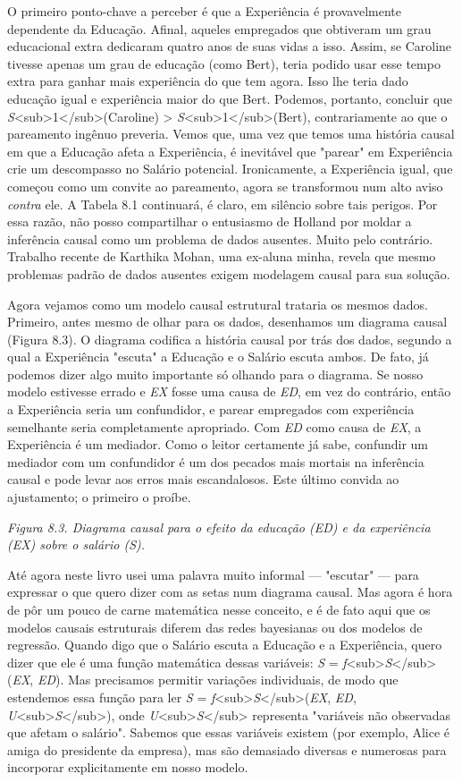 \documentclass[11pt,a5paper,twoside]{book}
\begin{document}
O primeiro ponto-chave a perceber é que a Experiência é provavelmente dependente da Educação. Afinal, aqueles empregados que obtiveram um grau educacional extra dedicaram quatro anos de suas vidas a isso. Assim, se Caroline tivesse apenas um grau de educação (como Bert), teria podido usar esse tempo extra para ganhar mais experiência do que tem agora. Isso lhe teria dado educação igual e experiência maior do que Bert. Podemos, portanto, concluir que \textit{S}<sub>1</sub>(Caroline) > \textit{S}<sub>1</sub>(Bert), contrariamente ao que o pareamento ingênuo preveria. Vemos que, uma vez que temos uma história causal em que a Educação afeta a Experiência, é inevitável que "parear" em Experiência crie um descompasso no Salário potencial. Ironicamente, a Experiência igual, que começou como um convite ao pareamento, agora se transformou num alto aviso \textit{contra} ele. A Tabela 8.1 continuará, é claro, em silêncio sobre tais perigos. Por essa razão, não posso compartilhar o entusiasmo de Holland por moldar a inferência causal como um problema de dados ausentes. Muito pelo contrário. Trabalho recente de Karthika Mohan, uma ex-aluna minha, revela que mesmo problemas padrão de dados ausentes exigem modelagem causal para sua solução.

Agora vejamos como um modelo causal estrutural trataria os mesmos dados. Primeiro, antes mesmo de olhar para os dados, desenhamos um diagrama causal (Figura 8.3). O diagrama codifica a história causal por trás dos dados, segundo a qual a Experiência "escuta" a Educação e o Salário escuta ambos. De fato, já podemos dizer algo muito importante só olhando para o diagrama. Se nosso modelo estivesse errado e \textit{EX} fosse uma causa de \textit{ED}, em vez do contrário, então a Experiência seria um confundidor, e parear empregados com experiência semelhante seria completamente apropriado. Com \textit{ED} como causa de \textit{EX}, a Experiência é um mediador. Como o leitor certamente já sabe, confundir um mediador com um confundidor é um dos pecados mais mortais na inferência causal e pode levar aos erros mais escandalosos. Este último convida ao ajustamento; o primeiro o proíbe.

\textit{Figura 8.3. Diagrama causal para o efeito da educação (ED) e da experiência (EX) sobre o salário (S).}

Até agora neste livro usei uma palavra muito informal — "escutar" — para expressar o que quero dizer com as setas num diagrama causal. Mas agora é hora de pôr um pouco de carne matemática nesse conceito, e é de fato aqui que os modelos causais estruturais diferem das redes bayesianas ou dos modelos de regressão. Quando digo que o Salário escuta a Educação e a Experiência, quero dizer que ele é uma função matemática dessas variáveis: \textit{S} = \textit{f}<sub>\textit{S}</sub>(\textit{EX}, \textit{ED}). Mas precisamos permitir variações individuais, de modo que estendemos essa função para ler \textit{S} = \textit{f}<sub>\textit{S}</sub>(\textit{EX}, \textit{ED}, \textit{U}<sub>\textit{S}</sub>), onde \textit{U}<sub>\textit{S}</sub> representa "variáveis não observadas que afetam o salário". Sabemos que essas variáveis existem (por exemplo, Alice é amiga do presidente da empresa), mas são demasiado diversas e numerosas para incorporar explicitamente em nosso modelo.
\end{document}

